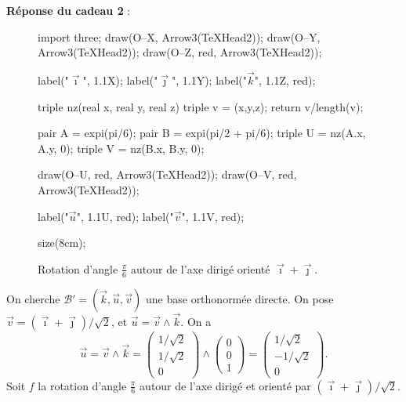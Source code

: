\documentclass[a4paper]{article}
\begin{document}
	\bigskip
	\bigskip
	\textbf{Réponse du cadeau 2} :\\
	\begin{figure}[H]
		\centering
		\begin{asy}
			import three;
			draw(O--X, Arrow3(TeXHead2));
			draw(O--Y, Arrow3(TeXHead2));
			draw(O--Z, red, Arrow3(TeXHead2));
			
			label("$\vec\imath$", 1.1X);
			label("$\vec\jmath$", 1.1Y);
			label("$\vec k$", 1.1Z, red);

			triple nz(real x, real y, real z) { triple v = (x,y,z); return v/length(v); }

			pair A = expi(pi/6);
			pair B = expi(pi/2 + pi/6);
			triple U = nz(A.x, A.y, 0);
			triple V = nz(B.x, B.y, 0);

			draw(O--U, red, Arrow3(TeXHead2));
			draw(O--V, red, Arrow3(TeXHead2));

			label("$\vec u$", 1.1U, red);
			label("$\vec v$", 1.1V, red);

			size(8cm);
		\end{asy}
		\caption{Rotation d'angle $\frac{\pi}{6}$\/ autour de l'axe dirigé orienté $\vec{\imath} + \vec{\jmath}$.}
	\end{figure}
	On cherche $\mathcal{B}' = (\vec{k}, \vec{u}, \vec{v})$\/ une base orthonormée directe. On pose $\vec{v} = (\vec{\imath} + \vec{\jmath}) / \sqrt{2}$, et $\vec{u} = \vec{v} \wedge \vec{k}$.
	On a \[
		\vec{u} = \vec{v} \wedge \vec{k} = \begin{pmatrix}
			1 / \sqrt{2}\\ 1 / \sqrt{2}\\ 0
		\end{pmatrix} \wedge \begin{pmatrix}
			0 \\ 0 \\ 1
		\end{pmatrix} = \begin{pmatrix}
			1 / \sqrt{2} \\ - 1 / \sqrt{2} \\ 0
		\end{pmatrix}
	.\] 
	Soit $f$\/ la rotation d'angle $\frac{\pi}{6}$\/ autour de l'axe dirigé et orienté par $(\vec{\imath} + \vec{\jmath}) / \sqrt{2}$.
\end{document}

